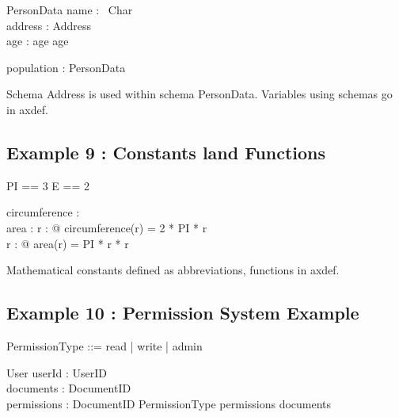 \documentclass[a4paper,10pt,fleqn]{article}
\begin{document}
\begin{schema}{PersonData}
name : \seq~Char \\
address : Address \\
age : \nat
\where
age  \land age 
\end{schema}

\begin{axdef}
population : \finset PersonData
\end{axdef}

\noindent Schema Address is used within schema PersonData. Variables using schemas go in axdef.

\bigskip

\subsection*{Example 9 : Constants land Functions}

\begin{zed}
PI == 3
\also
E == 2
\end{zed}

\begin{axdef}
circumference : \nat \fun \nat \\
area : \nat \fun \nat
\where
\forall r : \nat @ circumference(r) = 2 * PI * r \\
\forall r : \nat @ area(r) = PI * r * r
\end{axdef}

\noindent Mathematical constants defined as abbreviations, functions in axdef.

\bigskip

\subsection*{Example 10 : Permission System Example}

\begin{zed}
\also
PermissionType ::= read | write | admin
\end{zed}

\begin{schema}{User}
userId : UserID \\
documents : \power DocumentID \\
permissions : DocumentID \pfun PermissionType
\where
\dom permissions \subseteq documents
\end{schema}
\end{document}
